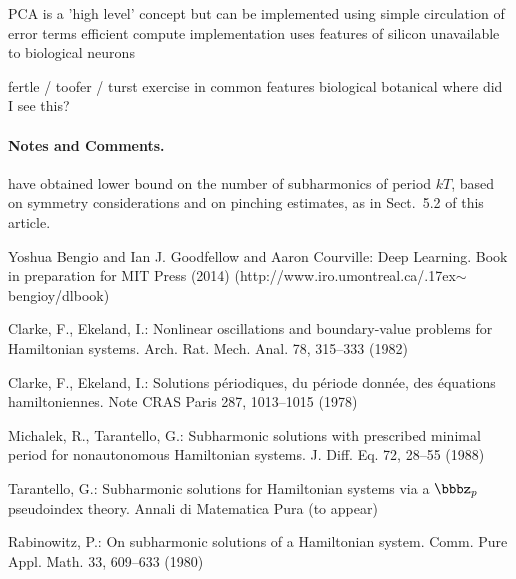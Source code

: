 \documentclass{llncs}
\begin{document}
PCA is a 'high level' concept
  but can be implemented using simple circulation of error terms
  efficient compute implementation uses features of silicon unavailable to biological neurons


fertle / toofer / turst exercise in common features biological botanical
  where did I see this?
  




\paragraph{Notes and Comments.}

have obtained lower bound on the number of subharmonics of period $kT$,
based on symmetry considerations and on pinching estimates, as in
Sect.~5.2 of this article.


%
%
\begin{thebibliography}{5}
%


Yoshua Bengio and Ian J. Goodfellow and Aaron Courville:
Deep Learning.
Book in preparation for MIT Press (2014)
(http://www.iro.umontreal.ca/{\raise.17ex\hbox{$\scriptstyle\sim$}}bengioy/dlbook)


Clarke, F., Ekeland, I.:
Nonlinear oscillations and
boundary-value problems for Hamiltonian systems.
Arch. Rat. Mech. Anal. 78, 315--333 (1982)

Clarke, F., Ekeland, I.:
Solutions p\'{e}riodiques, du
p\'{e}riode donn\'{e}e, des \'{e}quations hamiltoniennes.
Note CRAS Paris 287, 1013--1015 (1978)

Michalek, R., Tarantello, G.:
Subharmonic solutions with prescribed minimal
period for nonautonomous Hamiltonian systems.
J. Diff. Eq. 72, 28--55 (1988)

Tarantello, G.:
Subharmonic solutions for Hamiltonian
systems via a $\bbbz_{p}$ pseudoindex theory.
Annali di Matematica Pura (to appear)

Rabinowitz, P.:
On subharmonic solutions of a Hamiltonian system.
Comm. Pure Appl. Math. 33, 609--633 (1980)

\end{thebibliography}
\end{document}
